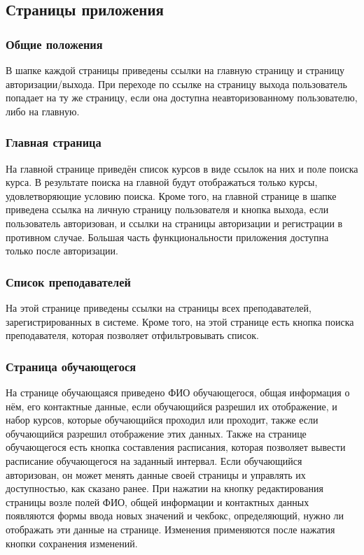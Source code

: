 \documentclass[11pt]{article}
\begin{document}
\subsection{Страницы приложения}
\label{sec:org9dc8f07}
\subsubsection{Общие положения}
\label{sec:org3bbeee0}
В шапке каждой страницы приведены ссылки на главную страницу и страницу авторизации/выхода.
При переходе по ссылке на страницу выхода пользователь попадает на ту же страницу, если она
доступна неавторизованному пользователю, либо на главную.
\subsubsection{Главная страница}
\label{sec:org5440ca0}
На главной странице приведён список курсов в виде ссылок на них и поле
поиска курса. В результате поиска на главной будут отображаться только курсы, удовлетворяющие
условию поиска. Кроме того, на главной странице в шапке приведена ссылка на личную страницу
пользователя и кнопка выхода, если пользователь авторизован, и ссылки на страницы авторизации
и регистрации в противном случае. Большая часть функциональности приложения доступна только
после авторизации.
\subsubsection{Список преподавателей}
\label{sec:org50fb82e}
На этой странице приведены ссылки на страницы всех преподавателей, зарегистрированных в системе.
Кроме того, на этой странице есть кнопка поиска преподавателя, которая позволяет отфильтровывать
список.
\subsubsection{Страница обучающегося}
\label{sec:org6c1289c}
На странице обучающаяся приведено ФИО обучающегося, общая информация о нём, его контактные данные,
если обучающийся разрешил их отображение, и набор курсов, которые обучающийся проходил или
проходит, также если обучающийся разрешил отображение этих данных. Также на странице обучающегося
есть кнопка составления расписания, которая позволяет вывести расписание обучающегося на заданный
интервал. Если обучающийся авторизован, он может менять данные своей страницы и управлять их
доступностью, как сказано ранее. При нажатии на кнопку редактирования страницы возле полей ФИО,
общей информации и контактных данных появляются формы ввода новых значений и чекбокс,
определяющий, нужно ли отображать эти данные на странице. Изменения применяются после нажатия
кнопки сохранения изменений.
\end{document}
